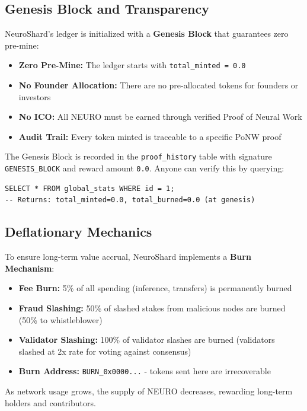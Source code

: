 \documentclass[11pt,a4paper]{article}
\begin{document}
\subsection{Genesis Block and Transparency}

NeuroShard's ledger is initialized with a \textbf{Genesis Block} that guarantees zero pre-mine:

\begin{itemize}
    \item \textbf{Zero Pre-Mine:} The ledger starts with \texttt{total\_minted = 0.0}
    \item \textbf{No Founder Allocation:} There are no pre-allocated tokens for founders or investors
    \item \textbf{No ICO:} All NEURO must be earned through verified Proof of Neural Work
    \item \textbf{Audit Trail:} Every token minted is traceable to a specific PoNW proof
\end{itemize}

The Genesis Block is recorded in the \texttt{proof\_history} table with signature \texttt{GENESIS\_BLOCK} and reward amount \texttt{0.0}. Anyone can verify this by querying:
\begin{verbatim}
SELECT * FROM global_stats WHERE id = 1;
-- Returns: total_minted=0.0, total_burned=0.0 (at genesis)
\end{verbatim}

\subsection{Deflationary Mechanics}
To ensure long-term value accrual, NeuroShard implements a \textbf{Burn Mechanism}:
\begin{itemize}
    \item \textbf{Fee Burn:} 5\% of all spending (inference, transfers) is permanently burned
    \item \textbf{Fraud Slashing:} 50\% of slashed stakes from malicious nodes are burned (50\% to whistleblower)
    \item \textbf{Validator Slashing:} 100\% of validator slashes are burned (validators slashed at 2x rate for voting against consensus)
    \item \textbf{Burn Address:} \texttt{BURN\_0x0000...} - tokens sent here are irrecoverable
\end{itemize}
As network usage grows, the supply of NEURO decreases, rewarding long-term holders and contributors.
\end{document}
